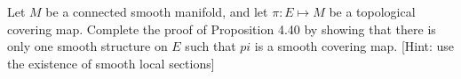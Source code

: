 Let $M$ be a connected smooth manifold, and let $\pi:E\mapsto M$ be a topological covering map.  Complete the proof of Proposition 4.40 by showing that there is only one smooth structure on $E$ such that $pi$ is a smooth covering map. [Hint: use the existence of smooth local sections]\